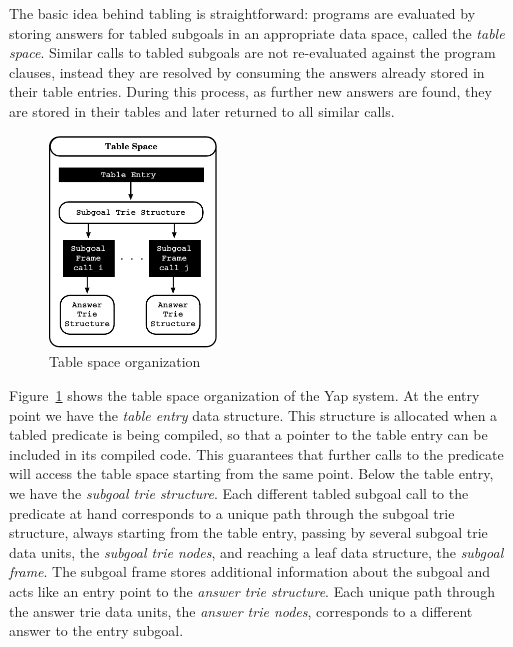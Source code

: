 \documentclass{llncs}
\begin{document}
The basic idea behind tabling is straightforward: programs are
evaluated by storing answers for tabled subgoals in an appropriate
data space, called the \emph{table space}. Similar calls to tabled
subgoals are not re-evaluated against the program clauses, instead
they are resolved by consuming the answers already stored in their
table entries. During this process, as further new answers are found,
they are stored in their tables and later returned to all similar
calls.

\begin{figure}
\centering
\includegraphics[width=4.5cm]{figures/table-space.pdf}
\caption{Table space organization}
\label{fig_table_space}
\end{figure}

Figure~\ref{fig_table_space} shows the table space organization of the
Yap system. At the entry point we have the \emph{table entry} data
structure. This structure is allocated when a tabled predicate is
being compiled, so that a pointer to the table entry can be included
in its compiled code. This guarantees that further calls to the
predicate will access the table space starting from the same
point. Below the table entry, we have the \emph{subgoal trie
  structure}. Each different tabled subgoal call to the predicate at
hand corresponds to a unique path through the subgoal trie structure,
always starting from the table entry, passing by several subgoal trie
data units, the \emph{subgoal trie nodes}, and reaching a leaf data
structure, the \emph{subgoal frame}. The subgoal frame stores
additional information about the subgoal and acts like an entry point
to the \emph{answer trie structure}. Each unique path through the
answer trie data units, the \emph{answer trie nodes}, corresponds to a
different answer to the entry subgoal.

\end{document}
